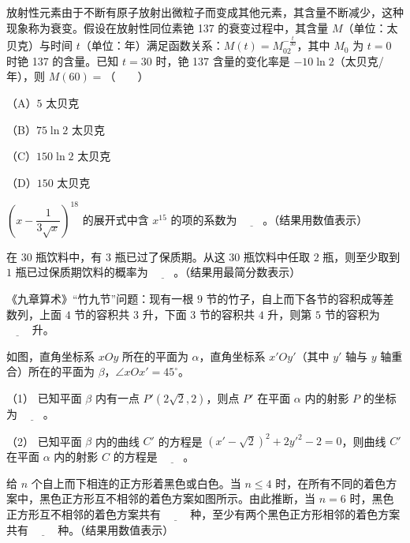 \begin{question}
放射性元素由于不断有原子放射出微粒子而变成其他元素，其含量不断减少，这种现象称为衰变。假设在放射性同位素铯 137 的衰变过程中，其含量 $M$（单位：太贝克）与时间 $t$（单位：年）满足函数关系：$M(t)=M_02^{-\frac t{30}}$，其中 $M_0$ 为 $t=0$ 时铯 137 的含量。已知 $t=30$ 时，铯 137 含量的变化率是 $-10\ln2$（太贝克/年），则 $M(60)=$\mbox{（　　）}

（A）$5$ 太贝克

（B）$75\ln2$ 太贝克

（C）$150\ln2$ 太贝克

（D）$150$ 太贝克

\end{question}

\begin{question}
$\left(x-\dfrac1{3\sqrt x}\right)^{18}$ 的展开式中含 $x^{15}$ 的项的系数为 $\underline{\qquad}$。（结果用数值表示）

\end{question}
\begin{question}
在 $30$ 瓶饮料中，有 $3$ 瓶已过了保质期。从这 $30$ 瓶饮料中任取 $2$ 瓶，则至少取到 $1$ 瓶已过保质期饮料的概率为 $\underline{\qquad}$。（结果用最简分数表示）

\end{question}
\begin{question}
《九章算术》“竹九节”问题：现有一根 $9$ 节的竹子，自上而下各节的容积成等差数列，上面 $4$ 节的容积共 $3$ 升，下面 $3$ 节的容积共 $4$ 升，则第 $5$ 节的容积为 $\underline{\qquad}$ 升。

\Needspace{0.4\textheight}
\end{question}
\begin{question}
如图，直角坐标系 $xOy$ 所在的平面为 $\alpha$，直角坐标系 $x'Oy'$（其中 $y'$ 轴与 $y$ 轴重合）所在的平面为 $\beta$，$\angle xOx'=45^\circ$。

（1） 已知平面 $\beta$ 内有一点 $P'\left(2\sqrt2,2\right)$，则点 $P'$ 在平面 $\alpha$ 内的射影 $P$ 的坐标为 $\underline{\qquad}$。

（2） 已知平面 $\beta$ 内的曲线 $C'$ 的方程是 $\left(x'-\sqrt2\right)^2+2y'^2-2=0$，则曲线 $C'$ 在平面 $\alpha$ 内的射影 $C$ 的方程是 $\underline{\qquad}$。
\nopagebreak[4]
\begin{center}\end{center}
\nopagebreak[4]
\Needspace{0.4\textheight}
\end{question}
\begin{question}
给 $n$ 个自上而下相连的正方形着黑色或白色。当 $n\leqslant4$ 时，在所有不同的着色方案中，黑色正方形互不相邻的着色方案如图所示。由此推断，当 $n=6$ 时，黑色正方形互不相邻的着色方案共有 $\underline{\qquad}$ 种，至少有两个黑色正方形相邻的着色方案共有 $\underline{\qquad}$ 种。（结果用数值表示）
\nopagebreak[4]
\begin{center}\end{center}
\nopagebreak[4]
\end{question}

